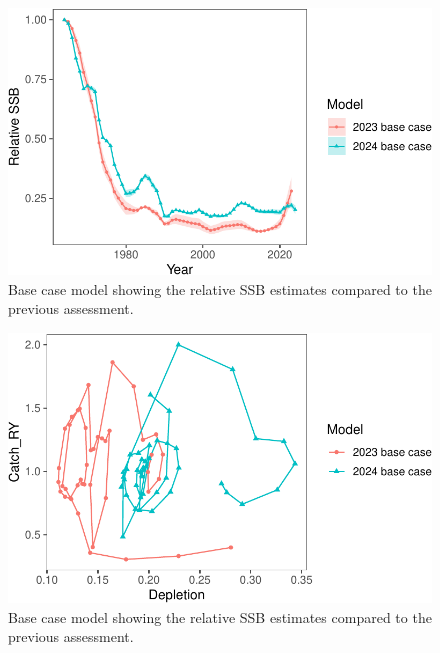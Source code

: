 \documentclass[
  letterpaper,
  DIV=11,
  numbers=noendperiod]{scrartcl}
\begin{document}
\begin{figure}[H]

{\centering \includegraphics{00-Namibian_hake_model_2024_files/figure-pdf/depl-1.pdf}

}

\caption{Base case model showing the relative SSB estimates compared to
the previous assessment.}

\end{figure}%

\begin{figure}[H]

{\centering \includegraphics{00-Namibian_hake_model_2024_files/figure-pdf/kobe-1.pdf}

}

\caption{Base case model showing the relative SSB estimates compared to
the previous assessment.}

\end{figure}%
\end{document}
